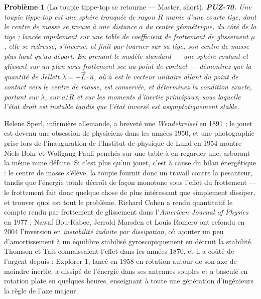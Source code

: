\documentclass[11pt]{article}
\newtheorem{problem}{Problème}
\begin{document}
\begin{problem}[{La toupie tippe-top se retourne --- Master, short}]
\textbf{PUZ-70.} Une toupie tippe-top est une sphère tronquée de rayon
$ R $ munie d'une courte tige, dont le centre de masse se trouve à une distance $ a $ du
centre géométrique, du côté de la tige ; lancée rapidement sur une table de coefficient de
frottement de glissement $ \mu $, elle se redresse, s'inverse, et finit par tourner sur sa
tige, son centre de masse \textit{plus haut} qu'au départ. En prenant le modèle standard --- une
sphère roulant et glissant sur un plan sous frottement sec au point de contact --- démontrez
que la quantité de Jellett $ \lambda = -\vec{L}\cdot\hat{a} $, où $ \hat{a} $ est le
vecteur unitaire allant du point de contact vers le centre de masse, est conservée, et
déterminez la condition exacte, portant sur $ \lambda $, sur $ a/R $ et sur les moments
d'inertie principaux, sous laquelle l'état droit est instable tandis que l'état inversé est
asymptotiquement stable.
\end{problem}

\noindent Helene Sperl, infirmière allemande, a breveté une \textit{Wendekreisel} en
1891 ; le jouet est devenu une obsession de physiciens dans les années 1950, et une
photographie prise lors de l'inauguration de l'Institut de physique de Lund en 1954 montre
Niels Bohr et Wolfgang Pauli penchés sur une table à en regarder une, arborant la même mine
défaite. Si c'est plus qu'un jouet, c'est à cause du bilan énergétique : le centre de masse
s'élève, la toupie fournit donc un travail contre la pesanteur, tandis que l'énergie totale
décroît de façon monotone sous l'effet du frottement --- le frottement fait donc quelque chose
de plus intéressant que simplement dissiper, et trouver quoi est tout le problème. Richard
Cohen a rendu quantitatif le compte rendu par frottement de glissement dans l'\textit{American
Journal of Physics} en 1977 ; Nawaf Bou-Rabee, Jerrold Marsden et Louis Romero ont refondu
en 2004 l'inversion en \textit{instabilité induite par dissipation}, où ajouter un peu
d'amortissement à un équilibre stabilisé gyroscopiquement en détruit la stabilité. Thomson et
Tait connaissaient l'effet dans les années 1870, et il a coûté de l'argent depuis :
Explorer 1, lancé en 1958 en rotation autour de son axe de moindre inertie, a dissipé de
l'énergie dans ses antennes souples et a basculé en rotation plate en quelques heures,
enseignant à toute une génération d'ingénieurs la règle de l'axe majeur.
\end{document}
